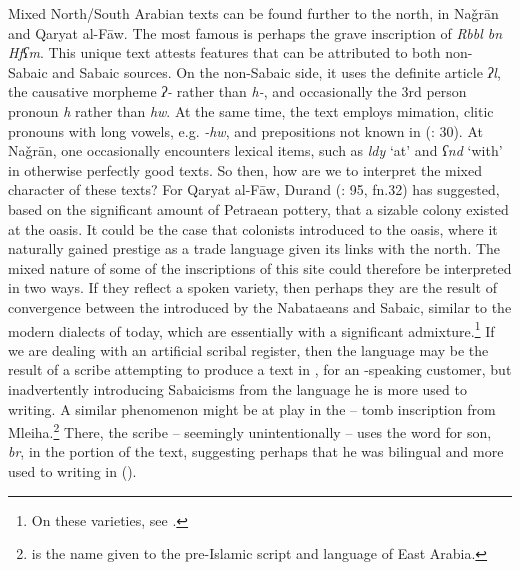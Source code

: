 \documentclass[output=paper]{langsci/langscibook}
\begin{document}
Mixed North/South Arabian texts can be found further to the north, in Naǧrān and Qaryat al-Fāw. The most famous is perhaps the grave inscription of \textit{Rbbl bn Hfʕm}. This unique text attests features that can be attributed to both non-Sabaic and Sabaic sources. On the non-Sabaic side, it uses the {definite} {article} \textit{ʔl}, the {causative} morpheme \textit{ʔ-} rather than \textit{h-}, and occasionally the 3rd person pronoun \textit{h} rather than \textit{hw}. At the same time, the text employs mimation, {clitic} pronouns with long vowels, e.g. \textit{-hw}, and {prepositions} not known in  (\citealt{Al-Jallad2018ANA}: 30). At Naǧrān, one occasionally encounters  lexical items, such as \textit{ldy} ‘at’ and \textit{ʕnd} ‘with’ in otherwise perfectly good  texts. So then, how are we to interpret the mixed character of these texts? For Qaryat al-Fāw, Durand (\citeyear{Durand2017}: 95, fn.32) has suggested, based on the significant amount of Petraean pottery, that a sizable  colony existed at the oasis. It could be the case that  colonists introduced  to the oasis, where it naturally gained {prestige} as a trade language given its links with the north. The mixed nature of some of the inscriptions of this site could therefore be interpreted in two ways. If they reflect a spoken variety, then perhaps they are the result of {convergence} between the  introduced by the Nabataeans and Sabaic, similar to the modern dialects of   today, which are essentially  with a significant  admixture.\footnote{On these varieties, see \citet{Watson2018}.} If we are dealing with an artificial scribal {register}, then the language may be the result of a scribe attempting to produce a text in , for an -speaking customer, but inadvertently introducing Sabaicisms from the language he is more used to writing. A similar phenomenon might be at play in the – tomb inscription from Mleiha.\footnote{ is the name given to the pre-Islamic script and language of East Arabia.} There, the scribe – seemingly unintentionally – uses the  word for son, \textit{br}, in the  portion of the text, suggesting perhaps that he was bilingual and more used to writing in  (\citealt{Overlaetetal2016}).
\end{document}

